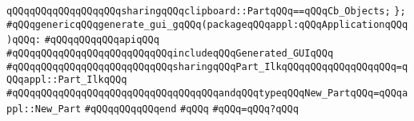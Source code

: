 \verb|qQQqqQQqqQQqqQQqqQQqsharingqQQqclipboard::PartqQQq==qQQqCb_Objects;|\newline
\newline
\verb|};|\newline
\newline
\newline
\newline
\verb|#qQQqgenericqQQqgenerate_gui_gqQQq(packageqQQqappl:qQQqApplicationqQQq)qQQq:|\newline
\verb|#qQQqqQQqqQQqapiqQQq|\newline
\verb|#qQQqqQQqqQQqqQQqqQQqqQQqqQQqincludeqQQqGenerated_GUIqQQq|\newline
\verb|#qQQqqQQqqQQqqQQqqQQqqQQqqQQqsharingqQQqPart_IlkqQQqqQQqqQQqqQQqqQQq=qQQqappl::Part_IlkqQQq|\newline
\verb|#qQQqqQQqqQQqqQQqqQQqqQQqqQQqqQQqqQQqandqQQqtypeqQQqNew_PartqQQq=qQQqappl::New_Part|\newline
\verb|#qQQqqQQqqQQqend|\newline
\verb|#qQQq|\newline
\verb|#qQQq=qQQq?qQQq|\newline
\newline
\newline
\newline
\newline
\newline
\newline
\newline
\newline
\newline
\newline
\newline

